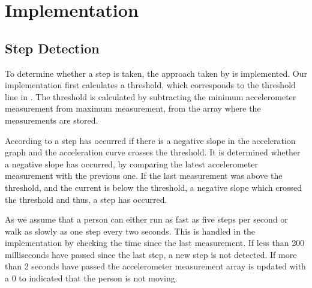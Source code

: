 \section{Implementation}
\subsection{Step Detection}\label{sec:stepCnt}
To determine whether a step is taken, the approach taken by \citet{zhao:pedometer} is implemented. Our implementation first calculates a threshold, which corresponds to the threshold line in . The threshold is calculated by subtracting the minimum accelerometer measurement from maximum measurement, from the array where the measurements are stored.

According to \citet[p. 2]{zhao:pedometer} a step has occurred if there is a negative slope in the acceleration graph and the acceleration curve crosses the threshold. It is determined whether a negative slope has occurred, by comparing the latest accelerometer measurement with the previous one. If the last measurement was above the threshold, and the current is below the threshold, a negative slope which crossed the threshold and thus, a step has occurred.

As \citet[p. 2]{zhao:pedometer} we assume that a person can either run as fast as five steps per second or walk as slowly as one step every two seconds. This is handled in the implementation by checking the time since the last measurement. If less than 200 milliseconds have passed since the last step, a new step is not detected. If more than 2 seconds have passed the accelerometer measurement array is updated with a 0 to indicated that the person is not moving.

